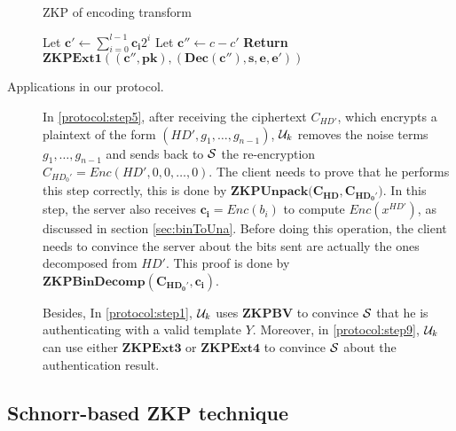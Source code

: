 \begin{description}
  \begin{algorithm}
    \caption{ZKP of encoding transform}\label{alg:ZKPBinDecomp}
    \begin{algorithmic}[1]
      \State Let $\mathbf{c'} \gets \sum_{i=0}^{l-1}\mathbf{c_i}2^i$
      \State Let $\mathbf{c''} \gets c - c' $
      \State \textbf{Return} $\mathbf{ZKPExt1((c'',pk),(Dec(c''),s,e,e'))}$
      \EndProcedure
    \end{algorithmic}
  \end{algorithm}
\item [Applications in our protocol.] In \ref{protocol:step5}, after receiving
  the ciphertext $C_{HD'}$, which encrypts a plaintext
  of the form $(HD', g_1, \dots, g_{n-1})$, $\mathcal{U}_k$ removes the noise terms $g_1, \dots,
  g_{n-1}$ and sends back to $\mathcal{S}$ the re-encryption $C_{HD_0'} = Enc(HD', 0, 0, \dots,
  0)$. The client needs to prove that he performs this step correctly, this is done
  by $\mathbf{ZKPUnpack(C_{HD},C_{HD_0'}})$. In this step, the server also receives $\mathbf{c_i} = Enc(b_i)$ to compute $Enc(x^{HD'})$, as discussed in section \ref{sec:binToUna}. Before doing this operation, the client needs to convince the server
  about the bits sent are actually the ones decomposed from $HD'$. This proof is done
  by $\mathbf{ZKPBinDecomp(C_{HD_0'},c_i)}$.

  Besides, In \ref{protocol:step1}, $\mathcal{U}_k$ uses $\mathbf{ZKPBV}$ to convince $\mathcal{S}$ that he is
  authenticating with a valid template $Y$. Moreover, in \ref{protocol:step9}, $\mathcal{U}_k$ can use either $\mathbf{ZKPExt3}$ or $\mathbf{ZKPExt4}$ to
  convince $\mathcal{S}$ about the authentication result.
\end{description}

\subsection{Schnorr-based ZKP technique}
\label{sec:zero-knowledge-proof}

